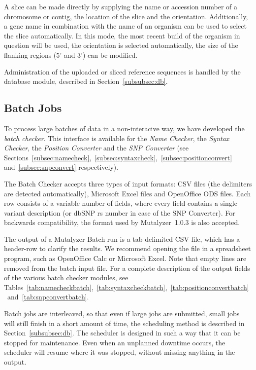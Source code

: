 \documentclass{article}
\begin{document}
A slice can be made directly by supplying the name or accession number of a
chromosome or contig, the location of the slice and the orientation.
Additionally, a gene name in combination with the name of an organism can be
used to select the slice automatically. In this mode, the most recent build of
the organism in question will be used, the orientation is selected
automatically, the size of the flanking regions (5' and 3') can be modified.

Administration of the uploaded or sliced reference sequences is handled by the
database module, described in Section~\ref{subsubsec:db}.

\subsection{Batch Jobs} \label{subsec:batch}
To process large batches of data in a non-interacive way, we have developed the
\emph{batch checker}. This interface is available for the \emph{Name Checker},
the \emph{Syntax Checker}, the \emph{Position Converter} and the
\emph{SNP Converter} (see
Sections~\ref{subsec:namecheck},~\ref{subsec:syntaxcheck},~\ref{subsec:positionconvert} and~\ref{subsec:snpconvert} respectively).

The Batch Checker accepts three types of input formats: CSV files (the
delimiters are detected automatically), Microsoft Excel files and OpenOffice
ODS files. Each row consists of a variable number of fields, where every field
contains a single variant description (or dbSNP rs number in case of the SNP
Converter). For backwards compatibility, the format used by Mutalyzer~1.0.3 is
also accepted.

The output of a Mutalyzer Batch run is a tab delimited CSV file, which has a
header-row to clarify the results. We recommend opening the file in a
spreadsheet program, such as OpenOffice Calc or Microsoft Excel. Note that
empty lines are removed from the batch input file. For a complete description
of the output fields of the various batch checker modules, see
Tables~\ref{tab:namecheckbatch},~\ref{tab:syntaxcheckbatch},~\ref{tab:positionconvertbatch}~and~\ref{tab:snpconvertbatch}.

Batch jobs are interleaved, so that even if large jobs are submitted, small
jobs will still finish in a short amount of time, the scheduling method is
described in Section~\ref{subsubsec:db}. The scheduler is designed in such a
way that it can be stopped for maintenance. Even when an unplanned downtime
occurs, the scheduler will resume where it was stopped, without missing
anything in the output.
\end{document}
